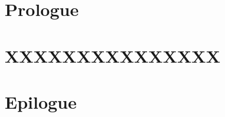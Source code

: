 \documentclass[a4paper,twoside,symmetric,concrete,justified,sfsidenotes]{unicam-diss}
\begin{document}
\frontmatter
{}








\mainmatter
{}
\part{Prologue}



\part{XXXXXXXXXXXXXXX}


\part{Epilogue}



\backmatter



\glsaddall
\begin{multipagefullwidth}
\printglossary[type=abbreviations,style=mcolindex]
\printnomenclature
\printbibliography

\end{multipagefullwidth}
\end{document}
